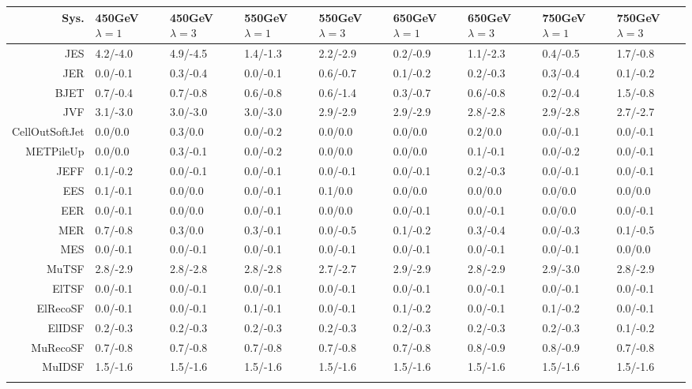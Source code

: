 \begin{tabular}{r|p{.08\linewidth}p{.08\linewidth}p{.08\linewidth}p{.08\linewidth}p{.08\linewidth}p{.08\linewidth}p{.08\linewidth}p{.08\linewidth}}
\toprule
 Sys.  & 450GeV $\lambda=1$  & 450GeV $\lambda=3$  & 550GeV $\lambda=1$  & 550GeV $\lambda=3$  & 650GeV $\lambda=1$  & 650GeV $\lambda=3$  & 750GeV $\lambda=1$  & 750GeV $\lambda=3$  \\
\toprule
JES  & 4.2/-4.0 & 4.9/-4.5 & 1.4/-1.3 & 2.2/-2.9 & 0.2/-0.9 & 1.1/-2.3 & 0.4/-0.5 & 1.7/-0.8 \\
JER  & 0.0/-0.1 & 0.3/-0.4 & 0.0/-0.1 & 0.6/-0.7 & 0.1/-0.2 & 0.2/-0.3 & 0.3/-0.4 & 0.1/-0.2 \\
BJET  & 0.7/-0.4 & 0.7/-0.8 & 0.6/-0.8 & 0.6/-1.4 & 0.3/-0.7 & 0.6/-0.8 & 0.2/-0.4 & 1.5/-0.8 \\
JVF  & 3.1/-3.0 & 3.0/-3.0 & 3.0/-3.0 & 2.9/-2.9 & 2.9/-2.9 & 2.8/-2.8 & 2.9/-2.8 & 2.7/-2.7 \\
CellOutSoftJet  & 0.0/0.0 & 0.3/0.0 & 0.0/-0.2 & 0.0/0.0 & 0.0/0.0 & 0.2/0.0 & 0.0/-0.1 & 0.0/-0.1 \\
METPileUp  & 0.0/0.0 & 0.3/-0.1 & 0.0/-0.2 & 0.0/0.0 & 0.0/0.0 & 0.1/-0.1 & 0.0/-0.2 & 0.0/-0.1 \\
JEFF  & 0.1/-0.2 & 0.0/-0.1 & 0.0/-0.1 & 0.0/-0.1 & 0.0/-0.1 & 0.2/-0.3 & 0.0/-0.1 & 0.0/-0.1 \\
EES  & 0.1/-0.1 & 0.0/0.0 & 0.0/-0.1 & 0.1/0.0 & 0.0/0.0 & 0.0/0.0 & 0.0/0.0 & 0.0/0.0 \\
EER  & 0.0/-0.1 & 0.0/0.0 & 0.0/-0.1 & 0.0/0.0 & 0.0/-0.1 & 0.0/-0.1 & 0.0/0.0 & 0.0/-0.1 \\
MER  & 0.7/-0.8 & 0.3/0.0 & 0.3/-0.1 & 0.0/-0.5 & 0.1/-0.2 & 0.3/-0.4 & 0.0/-0.3 & 0.1/-0.5 \\
MES  & 0.0/-0.1 & 0.0/-0.1 & 0.0/-0.1 & 0.0/-0.1 & 0.0/-0.1 & 0.0/-0.1 & 0.0/-0.1 & 0.0/0.0 \\
MuTSF  & 2.8/-2.9 & 2.8/-2.8 & 2.8/-2.8 & 2.7/-2.7 & 2.9/-2.9 & 2.8/-2.9 & 2.9/-3.0 & 2.8/-2.9 \\
ElTSF  & 0.0/-0.1 & 0.0/-0.1 & 0.0/-0.1 & 0.0/-0.1 & 0.0/-0.1 & 0.0/-0.1 & 0.0/-0.1 & 0.0/-0.1 \\
ElRecoSF  & 0.0/-0.1 & 0.0/-0.1 & 0.1/-0.1 & 0.0/-0.1 & 0.1/-0.2 & 0.0/-0.1 & 0.1/-0.2 & 0.0/-0.1 \\
ElIDSF  & 0.2/-0.3 & 0.2/-0.3 & 0.2/-0.3 & 0.2/-0.3 & 0.2/-0.3 & 0.2/-0.3 & 0.2/-0.3 & 0.1/-0.2 \\
MuRecoSF  & 0.7/-0.8 & 0.7/-0.8 & 0.7/-0.8 & 0.7/-0.8 & 0.7/-0.8 & 0.8/-0.9 & 0.8/-0.9 & 0.7/-0.8 \\
MuIDSF  & 1.5/-1.6 & 1.5/-1.6 & 1.5/-1.6 & 1.5/-1.6 & 1.5/-1.6 & 1.5/-1.6 & 1.5/-1.6 & 1.5/-1.6 \\
 \\
\bottomrule
\end{tabular}
